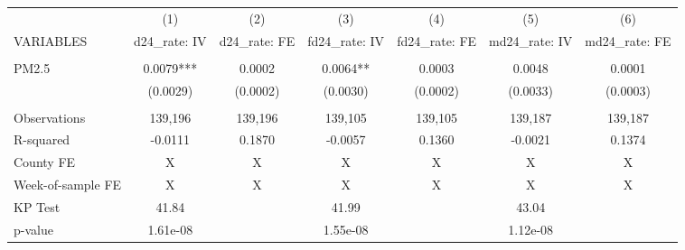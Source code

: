 \begin{tabular}{lcccccc} \hline
 & (1) & (2) & (3) & (4) & (5) & (6) \\
VARIABLES & d24\_rate: IV & d24\_rate: FE & fd24\_rate: IV & fd24\_rate: FE & md24\_rate: IV & md24\_rate: FE \\ \hline
 &  &  &  &  &  &  \\
PM2.5 & 0.0079*** & 0.0002 & 0.0064** & 0.0003 & 0.0048 & 0.0001 \\
 & (0.0029) & (0.0002) & (0.0030) & (0.0002) & (0.0033) & (0.0003) \\
 &  &  &  &  &  &  \\
Observations & 139,196 & 139,196 & 139,105 & 139,105 & 139,187 & 139,187 \\
R-squared & -0.0111 & 0.1870 & -0.0057 & 0.1360 & -0.0021 & 0.1374 \\
County FE & X & X & X & X & X & X \\
Week-of-sample FE & X & X & X & X & X & X \\
KP Test & 41.84 &  & 41.99 &  & 43.04 &  \\
 p-value & 1.61e-08 &  & 1.55e-08 &  & 1.12e-08 &  \\ \hline
\end{tabular}

